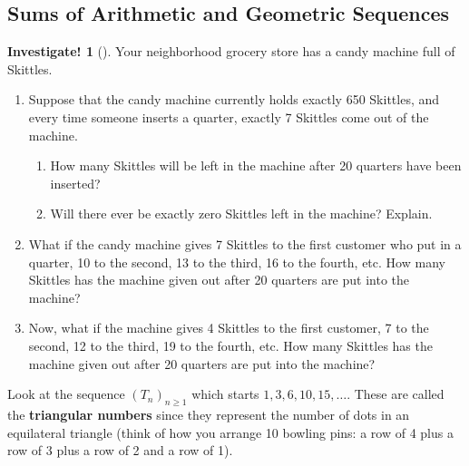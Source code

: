 \documentclass[12pt,]{book}
\newcommand{\terminology}[1]{\textbf{#1}}
\theoremstyle{plain}
\theoremstyle{definition}
\theoremstyle{definition}
\theoremstyle{definition}
\newtheorem{investigation}[project]{Investigate!}
\numberwithin{equation}{chapter}
\begin{document}
\subsection[{Sums of Arithmetic and Geometric Sequences}]{Sums of Arithmetic and Geometric Sequences}\label{subsection-1}
\begin{investigation}[]\label{investigation-5}
\hypertarget{p-123}{}%
Your neighborhood grocery store has a candy machine full of Skittles. %
\begin{enumerate}
\item\hypertarget{li-82}{}\hypertarget{p-124}{}%
Suppose that the candy machine currently holds exactly 650 Skittles, and every time someone inserts a quarter, exactly 7 Skittles come out of the machine. %
\begin{enumerate}
\item\hypertarget{li-83}{}\hypertarget{p-125}{}%
How many Skittles will be left in the machine after 20 quarters have been inserted?%
\item\hypertarget{li-84}{}\hypertarget{p-126}{}%
Will there ever be exactly zero Skittles left in the machine? Explain.%
\end{enumerate}
%
\item\hypertarget{li-85}{}\hypertarget{p-127}{}%
What if the candy machine gives 7 Skittles to the first customer who put in a quarter, 10 to the second, 13 to the third, 16 to the fourth, etc. How many Skittles has the machine given out after 20 quarters are put into the machine?%
\item\hypertarget{li-86}{}\hypertarget{p-128}{}%
Now, what if the machine gives 4 Skittles to the first customer, 7 to the second, 12 to the third, 19 to the fourth, etc. How many Skittles has the machine given out after 20 quarters are put into the machine?%
\end{enumerate}
%
\end{investigation}
\hypertarget{p-129}{}%
Look at the sequence \((T_n)_{n\ge 1}\) which starts \(1, 3, 6, 10, 15,\ldots\). These are called the \terminology{triangular numbers} since they represent the number of dots in an equilateral triangle (think of how you arrange 10 bowling pins: a row of 4 plus a row of 3 plus a row of 2 and a row of 1).%
\end{document}

